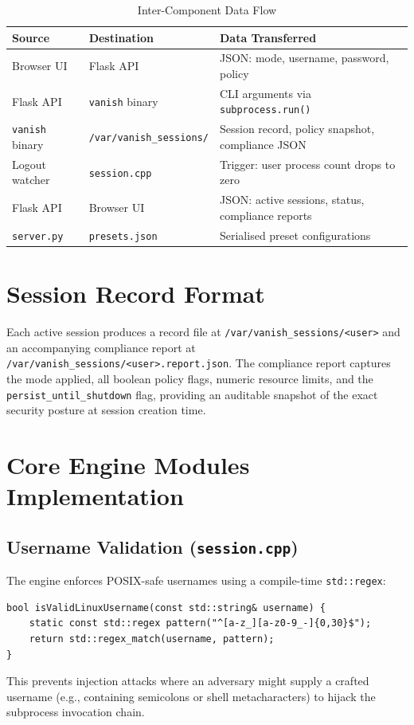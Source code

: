 \begin{table}[H]
\centering
\caption{Inter-Component Data Flow}
\label{tab:dataflow}
\begin{tabularx}{\linewidth}{p{3cm} p{3.5cm} X}
\toprule
Source & Destination & Data Transferred \\
\midrule
Browser UI & Flask API & JSON: mode, username, password, policy \\
Flask API & \texttt{vanish} binary & CLI arguments via \texttt{subprocess.run()} \\
\texttt{vanish} binary & \texttt{/var/vanish\_sessions/} & Session record, policy snapshot, compliance JSON \\
Logout watcher & \texttt{session.cpp} & Trigger: user process count drops to zero \\
Flask API & Browser UI & JSON: active sessions, status, compliance reports \\
\texttt{server.py} & \texttt{presets.json} & Serialised preset configurations \\
\bottomrule
\end{tabularx}
\end{table}

\section{Session Record Format}

Each active session produces a record file at \texttt{/var/\allowbreak vanish\_sessions/\allowbreak<user>} and an accompanying compliance report at \texttt{/var/\allowbreak vanish\_sessions/\allowbreak<user>\allowbreak .report.json}. The compliance report captures the mode applied, all boolean policy flags, numeric resource limits, and the \texttt{persist\_\allowbreak until\_\allowbreak shutdown} flag, providing an auditable snapshot of the exact security posture at session creation time.

\section{Core Engine Modules Implementation}

\subsection{Username Validation (\texttt{session.cpp})}

The engine enforces POSIX-safe usernames using a compile-time \texttt{std::regex}:
\begin{lstlisting}[style=cppstyle, caption=Username validation in session.cpp]
bool isValidLinuxUsername(const std::string& username) {
    static const std::regex pattern("^[a-z_][a-z0-9_-]{0,30}$");
    return std::regex_match(username, pattern);
}
\end{lstlisting}
This prevents injection attacks where an adversary might supply a crafted username (e.g., containing semicolons or shell metacharacters) to hijack the subprocess invocation chain.

